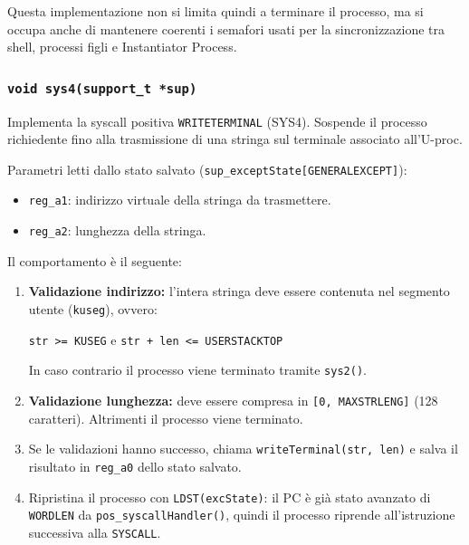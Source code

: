 \documentclass[a4paper,12pt]{article}
\begin{document}
\begin{enumerate}
Questa implementazione non si limita quindi a terminare il processo, ma si occupa anche di mantenere coerenti i semafori usati per la sincronizzazione tra shell, processi figli e Instantiator Process.





\subsubsection{\texttt{void sys4(support\_t *sup)}}
 
Implementa la syscall positiva \texttt{WRITETERMINAL} (SYS4). Sospende il
processo richiedente fino alla trasmissione di una stringa sul terminale
associato all'U-proc.
 
\medskip
Parametri letti dallo stato salvato (\texttt{sup\_exceptState[GENERALEXCEPT]}):
 
\begin{itemize}
    \item \texttt{reg\_a1}: indirizzo virtuale della stringa da trasmettere.
    \item \texttt{reg\_a2}: lunghezza della stringa.
\end{itemize}
 
Il comportamento è il seguente:
 
\begin{enumerate}
    \item \textbf{Validazione indirizzo:} l'intera stringa deve essere contenuta
          nel segmento utente (\texttt{kuseg}), ovvero:
          \begin{center}
              \texttt{str >= KUSEG} e \texttt{str + len <= USERSTACKTOP}
          \end{center}
          In caso contrario il processo viene terminato tramite \texttt{sys2()}.
 
    \item \textbf{Validazione lunghezza:} deve essere compresa in
          \texttt{[0, MAXSTRLENG]} (128 caratteri). Altrimenti il processo
          viene terminato.
 
    \item Se le validazioni hanno successo, chiama \texttt{writeTerminal(str, len)}
          e salva il risultato in \texttt{reg\_a0} dello stato salvato.
 
    \item Ripristina il processo con \texttt{LDST(excState)}: il PC è già stato
          avanzato di \texttt{WORDLEN} da \texttt{pos\_syscallHandler()}, quindi
          il processo riprende all'istruzione successiva alla \texttt{SYSCALL}.
\end{enumerate}
 

\end{enumerate}
\end{document}
